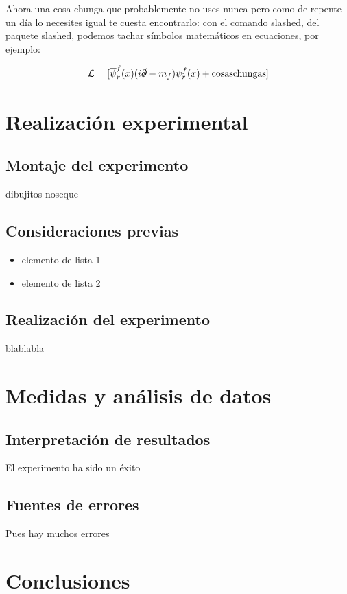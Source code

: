 \documentclass[12pt,a4paper]{article}
\begin{document}
\begin{multicols}{2}
Ahora una cosa chunga que probablemente no uses nunca pero como de repente un día lo necesites igual te cuesta encontrarlo: con el comando slashed, del paquete slashed, podemos tachar símbolos matemáticos en ecuaciones, por ejemplo:

\begin{equation*}
\mathcal{L}=[\overline{\psi}_r^f(x)(i\slashed\partial-m_f)\psi_r^f(x)+\text{cosaschungas}]
\end{equation*}

\section{Realización experimental}

\subsection{Montaje del experimento}
dibujitos noseque

\subsection{Consideraciones previas}
\label{consideraciones}

\begin{itemize}
\item elemento de lista 1
\item elemento de lista 2
\end{itemize}

\subsection{Realización del experimento}
blablabla
\section{Medidas y análisis de datos}
\subsection{Interpretación de resultados}
El experimento ha sido un éxito
\subsection{Fuentes de errores}
Pues hay muchos errores

\end{multicols} %


\section{Conclusiones}
\end{document}
